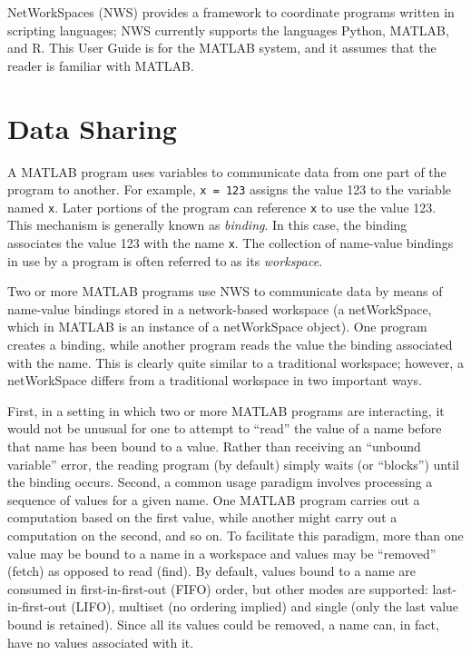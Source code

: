 NetWorkSpaces (NWS) provides a framework to coordinate programs written
in scripting languages; NWS currently supports the languages Python,
MATLAB, and R.  This User Guide is for the MATLAB system, and it
assumes that the reader is familiar with MATLAB.

\section{Data Sharing}
A MATLAB program uses variables to communicate data from one part of the
program to another.  For example, \texttt{x = 123} assigns the value 123
to the variable named \texttt{x}.  Later portions of the program can
reference \texttt{x} to use the value 123.  This mechanism is generally
known as \textit{binding}.  In this case, the binding associates the
value 123 with the name \texttt{x}.  The collection of name-value
bindings in use by a program is often referred to as its
\textit{workspace}.

Two or more MATLAB programs use NWS to communicate data by means of
name-value bindings stored in a network-based workspace (a netWorkSpace,
which in MATLAB is an instance of a netWorkSpace object).  One program
creates a binding, while another program reads the value the binding
associated with the name. This is clearly quite similar to a traditional
workspace; however, a netWorkSpace differs from a traditional workspace
in two important ways.

First, in a setting in which two or more MATLAB programs are
interacting, it would not be unusual for one to attempt to ``read'' the
value of a name before that name has been bound to a value.  Rather than
receiving an ``unbound variable'' error, the reading program (by default)
simply waits (or ``blocks'') until the binding occurs. Second, a common
usage paradigm involves processing a sequence of values for a given
name. One MATLAB program carries out a computation based on the first
value, while another might carry out a computation on the second, and so
on. To facilitate this paradigm, more than one value may be bound to a
name in a workspace and values may be ``removed'' (fetch) as opposed to
read (find). By default, values bound to a name are consumed in
first-in-first-out (FIFO) order, but other modes are supported:
last-in-first-out (LIFO), multiset (no ordering implied) and single
(only the last value bound is retained). Since all its values could be
removed, a name can, in fact, have no values associated with it.

